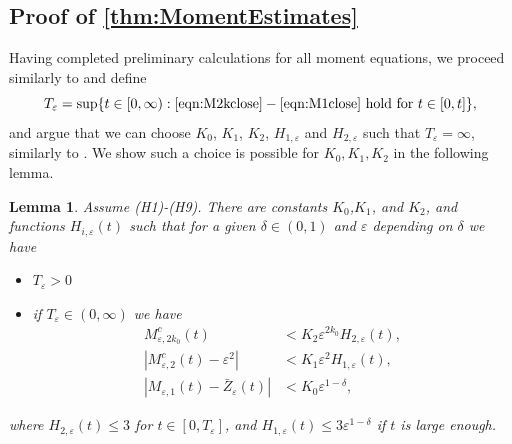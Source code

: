 \documentclass[]{article}
\newtheorem{lemma}{Lemma}
\theoremstyle{remark}
\begin{document}
\subsection{Proof of \cref{thm:MomentEstimates}}
Having completed preliminary calculations for all moment equations, we proceed similarly to \cite{GHM} and  define \[T_\varepsilon=\sup\{t\in[0,\infty):\eqref{eqn:M2kclose}-\eqref{eqn:M1close} \text{ hold for } t\in[0,t]\},\]
and argue that we can choose $K_0$,  $K_1$, $K_2$, $H_{1,\varepsilon}$ and $H_{2,\varepsilon}$ such that $T_\varepsilon=\infty$, similarly to \cite{GHM}. We show such a choice is possible for $K_0, K_1, K_2$ in the following lemma.
 \begin{lemma}
 \label{prop:InfiniteT_eps} 
 Assume (H1)-(H9). There are constants $K_0$,$K_1$, and $K_2$, and functions $H_{i,\varepsilon}(t)$ such that for a given $\delta\in(0,1)$ and $\varepsilon$ depending on  $\delta$ we have
 \begin{itemize}
     \item[(i)] $T_\varepsilon>0$
     \item[(ii)] if $T_\varepsilon\in(0,\infty)$ we have\begin{align}
 \label{eqn:M2kcloseT} M^{c}_{\varepsilon,2k_0}(t) &  <  K_{2} \varepsilon^{2k_0}H_{2,\varepsilon}(t), \\
\label{eqn:M2closeT} 
 \left | M_{\varepsilon,2}^{c}(t) -  \varepsilon^2  \right| & <  K_1\varepsilon^2 H_{1,\varepsilon}(t), \\
\label{eqn:M1closeT} \left| M_{\varepsilon,1}(t) - \bar{Z}_{\varepsilon}(t) \right|  & <  K_0 \varepsilon^{1-{\delta}},
\end{align}
 \end{itemize}
 where $H_{2,\varepsilon}(t)\leq{}3$ for $t\in[0,T_\varepsilon]$, and $H_{1,\varepsilon}(t)\leq{}3\varepsilon^{1-\delta}$ if $t$ is large enough.
     
 \end{lemma}
\end{document}
